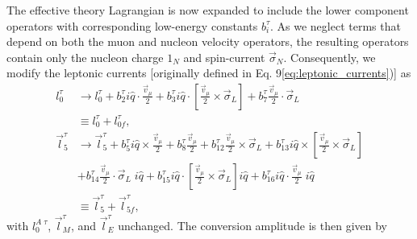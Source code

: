 \documentclass{book}[letterpaper,12pt]
\begin{document}
The effective theory Lagrangian is now expanded to include the lower component operators with corresponding low-energy constants $b_i^{\tau}$. As we neglect terms that depend on both the muon and nucleon velocity operators, the resulting operators contain only the nucleon charge $1_N$ and spin-current $\vec{\sigma}_N$. Consequently, we modify the leptonic currents [originally defined in Eq. 9\ref{eq:leptonic_currents})] as
\begin{equation}
\begin{split}
l_0^{\tau}&\rightarrow l_0^{\tau}+b_2^{\tau}i\hat{q}\cdot\frac{\vec{v}_{\mu}}{2}+b_3^{\tau}i\hat{q}\cdot\left[\frac{\vec{v}_{\mu}}{2}\times\vec{\sigma}_L\right]+b_7^{\tau}\frac{\vec{v}_{\mu}}{2}\cdot\vec{\sigma}_L\\
&\equiv l_0^{\tau}+l_{0f}^{\tau},\\
\vec{l}_5^{\tau}&\rightarrow \vec{l}_5^{\tau}+b_5^{\tau}i\hat{q}\times\frac{\vec{v}_{\mu}}{2}+b_8^{\tau}\frac{\vec{v}_{\mu}}{2}+b_{12}^{\tau}\frac{\vec{v}_{\mu}}{2}\times\vec{\sigma}_L+b_{13}^{\tau}i\hat{q}\times\left[\frac{\vec{v}_{\mu}}{2}\times\vec{\sigma}_L\right]\\&+b_{14}^{\tau}\frac{\vec{v}_{\mu}}{2}\cdot\vec{\sigma}_L\;i\hat{q}
+b_{15}^{\tau}i\hat{q}\cdot\left[\frac{\vec{v}_{\mu}}{2}\times\vec{\sigma}_L\right]i\hat{q}+b_{16}^{\tau}i\hat{q}\cdot\frac{\vec{v}_{\mu}}{2}\;i\hat{q}\\
&\equiv \vec{l}_5^{\tau}+\vec{l}_{5f}^{\tau},
\end{split}
\end{equation}
with $l_0^{A\;\tau}$, $\vec{l}_M^{\tau}$, and $\vec{l}_E^{\tau}$ unchanged. The conversion amplitude is then given by
\end{document}
